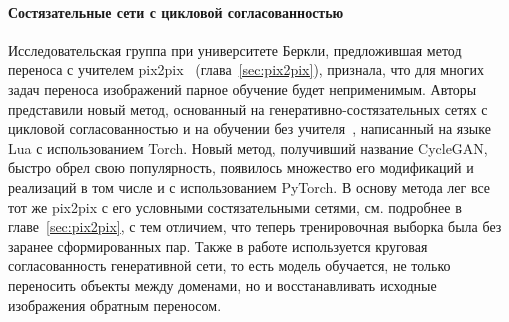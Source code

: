 \documentclass[11pt,a4paper]{extarticle}
\begin{document}
		\paragraph{Состязательные сети с цикловой согласованностью}

			Исследовательская группа при университете Беркли, предложившая метод переноса с учителем pix2pix~\cite{pix2pix} (глава~\ref{sec:pix2pix}),
			признала, что для многих задач переноса изображений парное обучение будет неприменимым.
			Авторы представили новый метод, основанный на генеративно-состязательных сетях с цикловой согласованностью и на обучении без учителя~\cite{CycleGAN}, написанный на языке Lua с использованием Torch.
			Новый метод, получивший название CycleGAN, быстро обрел свою популярность, появилось множество его модификаций и реализаций в том числе и с использованием PyTorch.
			\newline
			\newline
			В основу метода лег все тот же pix2pix с его условными состязательными сетями, см. подробнее в главе~\ref{sec:pix2pix}, с тем отличием, что теперь тренировочная выборка была без заранее сформированных пар.
			Также в работе используется круговая согласованность генеративной сети, то есть модель обучается, не только переносить объекты между доменами, но и восстанавливать исходные изображения обратным переносом.
			
\end{document}
